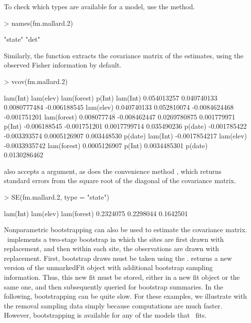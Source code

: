 \documentclass[article,shortnames]{jss}
\newcommand{\um}{\pkg{unmarked}}
\begin{document}
To check which types are available for a model, use the  method.

\begin{Schunk}
\begin{Sinput}
> names(fm.mallard.2)
\end{Sinput}
\begin{Soutput}
[1] "state" "det"  
\end{Soutput}
\end{Schunk}

Similarly, the  function extracts the covariance matrix of
the estimates, using the observed Fisher information by default.

\begin{Schunk}
\begin{Sinput}
> vcov(fm.mallard.2)
\end{Sinput}
\begin{Soutput}
                lam(Int)    lam(elev)   lam(forest)       p(Int)
lam(Int)     0.054013257  0.040740133  0.0080777484 -0.006188545
lam(elev)    0.040740133  0.052810074 -0.0084624468 -0.001751201
lam(forest)  0.008077748 -0.008462447  0.0269780875  0.001779971
p(Int)      -0.006188545 -0.001751201  0.0017799714  0.035490236
p(date)     -0.001785422 -0.003393574  0.0005126907  0.003448530
                  p(date)
lam(Int)    -0.0017854217
lam(elev)   -0.0033935742
lam(forest)  0.0005126907
p(Int)       0.0034485301
p(date)      0.0130286462
\end{Soutput}
\end{Schunk}

 also accepts a  argument, as does the convenience method 
, which returns standard errors from the square root of the diagonal 
of the covariance matrix.

\begin{Schunk}
\begin{Sinput}
> SE(fm.mallard.2, type = "state")
\end{Sinput}
\begin{Soutput}
   lam(Int)   lam(elev) lam(forest) 
  0.2324075   0.2298044   0.1642501 
\end{Soutput}
\end{Schunk}

Nonparametric bootstrapping can also be used to estimate the
covariance matrix. \um\ implements a two-stage bootstrap in which the
sites are first drawn with replacement, and then within each site, the
observations are drawn with replacement.  First, bootstrap draws must
be taken using the .   returns a new
version of the unmarkedFit object with additional bootstrap sampling
information.  Thus, this new fit must be stored, either in a new fit
object or the same one, and then subsequently queried for bootstrap
summaries.  In the following, bootstrapping can be quite slow.  For
these examples, we illustrate with the removal sampling data simply
because computations are much faster.  However, bootstrapping is
available for any of the models that \um\ fits.
\end{document}
